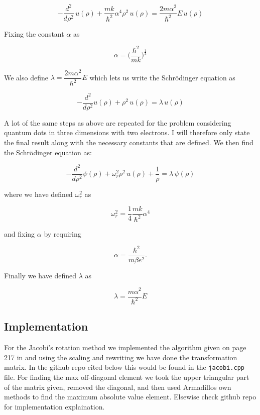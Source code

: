 \documentclass[a4paper, fontsize=11pt]{article}
\begin{document}
\begin{equation}
-\dfrac{d^2}{d\rho^2} \, u(\rho) + \dfrac{mk}{\hbar^2} \alpha^4 \rho^2 \, u(\rho) = \dfrac{2m\alpha^2}{\hbar^2} E \, u(\rho) 
\end{equation}

Fixing the constant $\alpha$ as 

\begin{equation}
\alpha=\Big(\dfrac{\hbar^2}{mk}\Big)^{\frac{1}{4}}
\end{equation} 

We also define $\lambda=\dfrac{2m\alpha^2}{\hbar^2}E$ which lets us write the Schr\"{o}dinger equation as

\begin{equation}
-\dfrac{d^2}{d\rho^2}u(\rho) + \rho^2 \, u(\rho) = \lambda \, u(\rho)
\end{equation}

A lot of the same steps as above are repeated for the problem considering quantum dots in three dimensions with two electrons. I will therefore only state the final result along with the necessary constants that are defined. We then find the Schr\"{o}dinger equation as:

\begin{equation}
-\dfrac{d^2}{d\rho^2}\psi(\rho) + \omega^2_{r}\rho^2 \, u(\rho) + \frac{1}{\rho} = \lambda \, \psi(\rho)
\end{equation}

where we have defined  $\omega_{r}^2$ as

\begin{equation}
\omega^2_{r}=\dfrac{1}{4} \dfrac{mk}{\hbar^2} \alpha^4
\end{equation}

and fixing $\alpha$ by requiring 

\begin{equation}
\alpha = \dfrac{\hbar^2}{m\beta e^2}.
\end{equation}

Finally we have defined $\lambda$ as

\begin{equation}
\lambda=\dfrac{m\alpha^2}{\hbar^2}E
\end{equation}



\subsection{Implementation}

For the Jacobi's rotation method we implemented the algorithm given on page 217 in \cite{Jensen} and using the scaling and rewriting we have done the transformation matrix. In the github repo cited below this would be found in the \verb+jacobi.cpp+ file. For finding the max off-diagonal element we took the upper triangular part of the matrix given, removed the diagonal, and then used Armadillos own methods to find the maximum absolute value element. Elsewise check github repo for implementation explaination.
\end{document}
